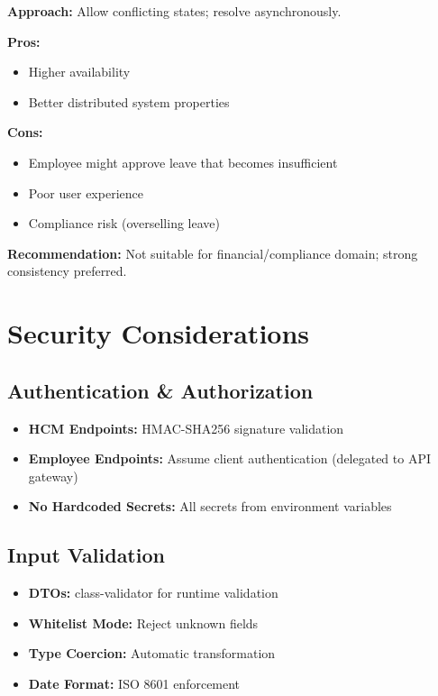 \documentclass[12pt,a4paper]{article}
\begin{document}
\textbf{Approach:} Allow conflicting states; resolve asynchronously.

\textbf{Pros:}
\begin{itemize}
    \item Higher availability
    \item Better distributed system properties
\end{itemize}

\textbf{Cons:}
\begin{itemize}
    \item Employee might approve leave that becomes insufficient
    \item Poor user experience
    \item Compliance risk (overselling leave)
\end{itemize}

\textbf{Recommendation:} Not suitable for financial/compliance domain; strong consistency preferred.

\newpage

\section{Security Considerations}

\subsection{Authentication \& Authorization}

\begin{itemize}
    \item \textbf{HCM Endpoints:} HMAC-SHA256 signature validation
    \item \textbf{Employee Endpoints:} Assume client authentication (delegated to API gateway)
    \item \textbf{No Hardcoded Secrets:} All secrets from environment variables
\end{itemize}

\subsection{Input Validation}

\begin{itemize}
    \item \textbf{DTOs:} class-validator for runtime validation
    \item \textbf{Whitelist Mode:} Reject unknown fields
    \item \textbf{Type Coercion:} Automatic transformation
    \item \textbf{Date Format:} ISO 8601 enforcement
\end{itemize}
\end{document}
